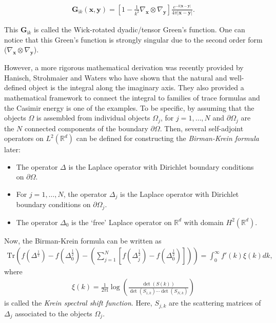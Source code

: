 \begin{align*}
    \boldsymbol{G}_{\mathrm{i}k}(\boldsymbol{x}, \boldsymbol{y}) = \left[1 - \frac{1}{k^{2}}\nabla_{\boldsymbol{x}}\otimes\nabla_{\boldsymbol{y}}\right]\frac{e^{-k|\boldsymbol{x} - \boldsymbol{y}|}}{4\pi|\boldsymbol{x} - \boldsymbol{y}|}.
\end{align*}

This $ \boldsymbol{G}_{\mathrm{i}k}$ is called the Wick-rotated dyadic/tensor Green's function. One can notice that this Green's function is strongly singular 
due to the second order form ($\nabla_{\boldsymbol{x}}\otimes\nabla_{\boldsymbol{y}}$). 



However, a more rigorous mathematical 
derivation was recently provided by Hanisch, Strohmaier and Waters \cite{hanisch2020relative} who have shown that the natural and well-defined object is the 
integral along the imaginary axis. They also provided a mathematical framework to connect the integral to families of trace formulas and the Casimir 
energy is one of the examples. To be specific, by assuming that the objects $\Omega$ is assembled from individual objects $\Omega_{j}$, for $j = 1, \dots, N$ and 
$\partial\Omega_{j}$ are the $N$ connected components of the boundary $\partial\Omega$. Then, several self-adjoint operators on $L^{2}(\mathbb{R}^{d})$
can be defined for constructing the \emph{Birman-Krein formula} later:
\begin{itemize}
    \item The operator $\Delta$ is the Laplace operator with Dirichlet boundary conditions on $\partial\Omega$.
    \item For $j = 1, \dots, N$, the operator $\Delta_{j}$ is the Laplace operator with Dirichlet boundary conditions on $\partial\Omega_{j}$.
    \item The operator $\Delta_{0}$ is the `free' Laplace operator on $\mathbb{R}^{d}$ with domain $H^{2}(\mathbb{R}^{d})$.
\end{itemize}

Now, the Birman-Krein formula can be written as 
\begin{align}\label{B-K formula}
    \text{Tr}\left(f(\Delta^{\frac{1}{2}}) - f(\Delta_{0}^{\frac{1}{2}}) - \left(\sum_{j = 1}^{N}[f(\Delta_{j}^{\frac{1}{2}}) - f(\Delta_{0}^{\frac{1}{2}})]\right)\right)  = \int_{0}^{\infty}f'(k)\xi(k)dk,
\end{align}
where 
\begin{align*}
    \xi(k) = \frac{1}{2\pi \mathrm{i}}\log\left(\frac{\det(S(k))}{\det(S_{1,k})\cdots\det(S_{N,k})}\right)
\end{align*}
is called the \emph{Krein spectral shift function}. Here, $S_{j,k}$ are the scattering matrices of $\Delta_{j}$ associated to the objects $\Omega_{j}$.

